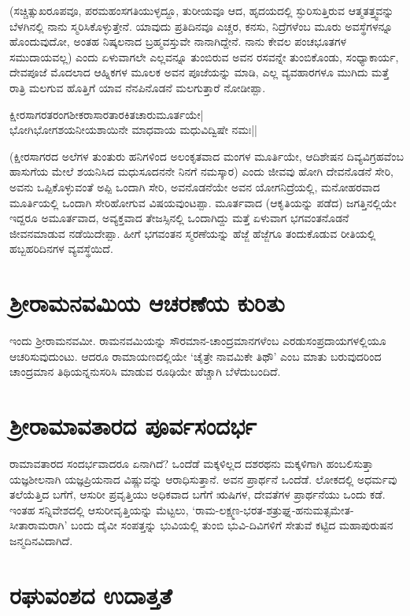 (ಸಚ್ಚಿತ್ಸುಖರೂಪವೂ, ಪರಮಹಂಸಗತಿಯುಳ್ಳದ್ದೂ, ತುರೀಯವೂ ಆದ, ಹೃದಯದಲ್ಲಿ ಸ್ಫುರಿಸುತ್ತಿರುವ ಆತ್ಮತತ್ತ್ವವನ್ನು ಬೆಳಗಿನಲ್ಲಿ ನಾನು ಸ್ಮರಿಸಿಕೊಳ್ಳುತ್ತೇನೆ. ಯಾವುದು ಪ್ರತಿದಿನವೂ ಎಚ್ಚರ, ಕನಸು, ನಿದ್ರೆಗಳೆಂಬ ಮೂರು ಅವಸ್ಥೆಗಳನ್ನೂ ಹೊಂದುವುದೋ, ಅಂತಹ ನಿಷ್ಕಲನಾದ ಬ್ರಹ್ಮವಸ್ತುವೇ ನಾನಾಗಿದ್ದೇನೆ. ನಾನು ಕೇವಲ ಪಂಚಭೂತಗಳ ಸಮುದಾಯವಲ್ಲ) ಎಂದು ಏಳುವಾಗಲೇ ಎಲ್ಲವನ್ನೂ ತುಂಬಿರುವ ಅವನ ರಸವನ್ನೇ ತುಂಬಿಕೊಂಡು, ಸಂಧ್ಯಾಕಾರ್ಯ, ದೇವಪೂಜೆ ಮೊದಲಾದ ಆಹ್ನಿಕಗಳ ಮೂಲಕ ಅವನ ಪೂಜೆಯನ್ನು ಮಾಡಿ, ಎಲ್ಲ ವ್ಯವಹಾರಗಳೂ ಮುಗಿದು ಮತ್ತೆ ರಾತ್ರಿ ಮಲಗುವ ಹೊತ್ತಿಗೆ ಯಾವ ನೆನಪಿನೊಡನೆ ಮಲಗುತ್ತಾರೆ ನೋಡೀಪ್ಪಾ. 

\begin{shloka} 
ಕ್ಷೀರಸಾಗರತರಂಗಶೀಕರಾಸಾರತಾರಕಿತಚಾರುಮೂರ್ತಯೇ|\label{147}\\
ಭೋಗಿಭೋಗಶಯನೀಯಶಾಯಿನೇ ಮಾಧವಾಯ ಮಧುವಿದ್ವಿಷೇ ನಮಃ||
\end{shloka} 

(ಕ್ಷೀರಸಾಗರದ ಅಲೆಗಳ ತುಂತುರು ಹನಿಗಳಿಂದ ಅಲಂಕೃತವಾದ ಮಂಗಳ ಮೂರ್ತಿಯೇ, ಆದಿಶೇಷನ ದಿವ್ಯವಿಗ್ರಹವೆಂಬ ಹಾಸುಗೆಯ ಮೇಲೆ ಶಯನಿಸಿದ ಮಧುಸೂದನನೇ ನಿನಗೆ ನಮಸ್ಕಾರ) ಎಂದು ಜೀವವು ಹೋಗಿ ದೇವನೊಡನೆ ಸೇರಿ, ಅವನು ಒಪ್ಪಿಕೊಳ್ಳುವಂತೆ ಅಪ್ಪಿ ಒಂದಾಗಿ ಸೇರಿ, ಅವನೊಡನೆಯೇ ಅವನ ಯೋಗನಿದ್ರೆಯಲ್ಲಿ, ಮನೋಹರವಾದ ಮೂರ್ತಿಯಲ್ಲಿ ಒಂದಾಗಿ ಸೇರಿಹೋಗುವ ವಿಷಯವುಂಟಪ್ಪಾ. ಮೂರ್ತವಾದ (ಆಕೃತಿಯನ್ನು ಪಡೆದ) ಜಗತ್ತಿನಲ್ಲಿಯೇ ಇದ್ದರೂ ಅಮೂರ್ತವಾದ, ಅವ್ಯಕ್ತವಾದ ತೇಜಸ್ಸಿನಲ್ಲಿ ಒಂದಾಗಿದ್ದು ಮತ್ತೆ ಏಳುವಾಗ ಭಗವಂತನೊಡನೆ ಜೀವನಮಾಡುವ ನಡೆಯಿದೇಪ್ಪಾ. ಹೀಗೆ ಭಗವಂತನ ಸ್ಮರಣೆಯನ್ನು ಹೆಜ್ಜೆ ಹೆಜ್ಜೆಗೂ ತಂದುಕೊಡುವ ರೀತಿಯಲ್ಲಿ ಹಬ್ಬಹರಿದಿನಗಳ ವ್ಯವಸ್ಥೆಯಿದೆ. 

\section*{ಶ್ರೀರಾಮನವಮಿಯ ಆಚರಣೆಯ ಕುರಿತು} 

ಇಂದು ಶ್ರೀರಾಮನವಮೀ. ರಾಮನವಮಿಯನ್ನು ಸೌರಮಾನ-ಚಾಂದ್ರಮಾನಗಳೆಂಬ ಎರಡುಸಂಪ್ರದಾಯಗಳಲ್ಲಿಯೂ ಆಚರಿಸುವುದುಂಟು. ಆದರೂ ರಾಮಾಯಣದಲ್ಲಿಯೇ `ಚೈತ್ರೇ ನಾವಮಿಕೇ ತಿಥೌ' ಎಂಬ ಮಾತು ಬರುವುದರಿಂದ ಚಾಂದ್ರಮಾನ ತಿಥಿಯನ್ನನುಸರಿಸಿ ಮಾಡುವ ರೂಢಿಯೇ ಹೆಚ್ಚಾಗಿ ಬೆಳೆದುಬಂದಿದೆ. 

\section*{ಶ್ರೀರಾಮಾವತಾರದ ಪೂರ್ವಸಂದರ್ಭ}

ರಾಮಾವತಾರದ ಸಂದರ್ಭವಾದರೂ ಏನಾಗಿದೆ? ಒಂದೆಡೆ ಮಕ್ಕಳಿಲ್ಲದ ದಶರಥನು ಮಕ್ಕಳಿಗಾಗಿ ಹಂಬಲಿಸುತ್ತಾ ಯಜ್ಞಶೀಲನಾಗಿ ಯಜ್ಞಪ್ರಿಯನಾದ ವಿಷ್ಣುವನ್ನು ಆರಾಧಿಸುತ್ತಾನೆ. ಅವನ ಪ್ರಾರ್ಥನೆ ಒಂದೆಡೆ. ಲೋಕದಲ್ಲಿ ಅಧರ್ಮವು ತಲೆಯೆತ್ತಿದ ಬಗೆಗೆ, ಆಸುರೀ ಪ್ರವೃತ್ತಿಯು ಅಧಿಕವಾದ ಬಗೆಗೆ ಋಷಿಗಳ, ದೇವತೆಗಳ ಪ್ರಾರ್ಥನೆಯು ಒಂದು ಕಡೆ. ಇಂತಹ ಸನ್ನಿವೇಶದಲ್ಲಿ ಆಸುರೀವೃತ್ತಿಯನ್ನು ಮೆಟ್ಟಲು, `ರಾಮ-ಲಕ್ಷ್ಮಣ-ಭರತ-ಶತ್ರುಘ್ನ-ಹನುಮತ್ಸಮೇತ-ಸೀತಾರಾಮರಾಗಿ' ಬಂದು ದೈವೀ ಸಂಪತ್ತನ್ನು ಭುವಿಯಲ್ಲಿ ತುಂಬಿ ಭುವಿ-ದಿವಿಗಳಿಗೆ ಸೇತುವೆ ಕಟ್ಟಿದ ಮಹಾಪುರುಷನ ಜನ್ಮದಿನವಿದಾಗಿದೆ. 

\section*{ರಘುವಂಶದ ಉದಾತ್ತತೆ} 

